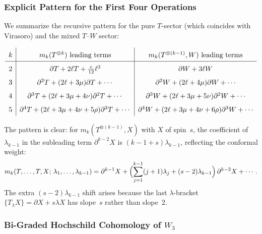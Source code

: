 \subsubsection{Explicit Pattern for the First Four Operations}

We summarize the recursive pattern for the pure $T$-sector (which
coincides with Virasoro) and the mixed $T$--$W$ sector:

\begin{equation}
\label{eq:w3-mk-pattern}
\renewcommand{\arraystretch}{1.6}
\begin{array}{c|c|c}
k & m_k(T^{\otimes k})\ \text{leading terms} & m_k(T^{\otimes(k-1)}, W)\ \text{leading terms} \\
\hline
2 & \partial T + 2\ell T + \tfrac{c}{12}\ell^3 & \partial W + 3\ell W \\
3 & \partial^2 T + (2\ell + 3\mu)\partial T + \cdots & \partial^2 W + (2\ell + 4\mu)\partial W + \cdots \\
4 & \partial^3 T + (2\ell + 3\mu + 4\nu)\partial^2 T + \cdots
 & \partial^3 W + (2\ell + 3\mu + 5\nu)\partial^2 W + \cdots \\
5 & \partial^4 T + (2\ell + 3\mu + 4\nu + 5\rho)\partial^3 T + \cdots
 & \partial^4 W + (2\ell + 3\mu + 4\nu + 6\rho)\partial^3 W + \cdots \\
\end{array}
\end{equation}

The pattern is clear: for $m_k(T^{\otimes(k-1)}, X)$ with $X$ of
spin~$s$, the coefficient of $\lambda_{k-1}$ in the subleading term
$\partial^{k-2} X$ is $(k-1+s)\lambda_{k-1}$, reflecting the conformal
weight:
\begin{equation}
\label{eq:w3-subleading-pattern}
m_k(T, \ldots, T, X;\, \lambda_1, \ldots, \lambda_{k-1})
= \partial^{k-1} X + \Bigl(\sum_{j=1}^{k-1} (j+1)\lambda_j + (s-2)\lambda_{k-1}\Bigr)\, \partial^{k-2} X + \cdots.
\end{equation}
The extra $(s-2)\lambda_{k-1}$ shift arises because the last
$\lambda$-bracket $\{T_\lambda X\} = \partial X + s\lambda X$ has
slope~$s$ rather than slope~$2$.

\subsubsection{Bi-Graded Hochschild Cohomology of $W_3$}

